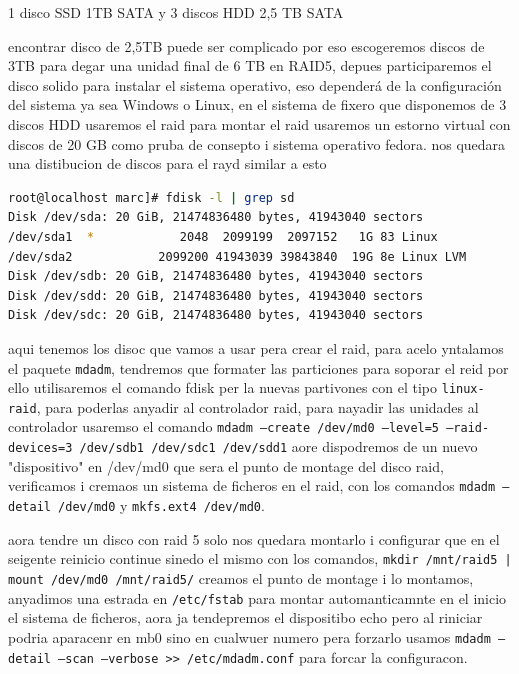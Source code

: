 \documentclass[preprint,11pt]{elsarticle}
\begin{document}
1 disco SSD 1TB SATA  y 3 discos  HDD 2,5 TB SATA\smallskip

encontrar disco de 2,5TB puede ser complicado por eso escogeremos discos de 3TB para degar una unidad final de 6 TB en RAID5, depues participaremos el disco solido para instalar el sistema operativo, eso dependerá de la configuración del sistema ya sea Windows o Linux, en el sistema de fixero que disponemos de 3 discos HDD usaremos el raid para montar el raid usaremos un estorno virtual con discos de 20 GB como pruba de consepto i sistema operativo fedora. nos quedara una distibucion de discos para el rayd similar a esto 

\begin{lstlisting}[basicstyle=\tiny, language=bash]
root@localhost marc]# fdisk -l | grep sd
Disk /dev/sda: 20 GiB, 21474836480 bytes, 41943040 sectors
/dev/sda1  *            2048  2099199  2097152   1G 83 Linux
/dev/sda2            2099200 41943039 39843840  19G 8e Linux LVM
Disk /dev/sdb: 20 GiB, 21474836480 bytes, 41943040 sectors
Disk /dev/sdd: 20 GiB, 21474836480 bytes, 41943040 sectors
Disk /dev/sdc: 20 GiB, 21474836480 bytes, 41943040 sectors

\end{lstlisting}

aqui tenemos los disoc que vamos a usar pera crear el raid, para acelo yntalamos el paquete \texttt{mdadm}, tendremos que formater las particiones para soporar el reid por ello utilisaremos el comando fdisk per la nuevas partivones con el tipo \texttt{linux-raid}, para poderlas anyadir al controlador raid, para nayadir las unidades al controlador usaremso el comando \texttt{mdadm --create /dev/md0 --level=5 --raid-devices=3 /dev/sdb1 /dev/sdc1 /dev/sdd1}  aore dispodremos de un nuevo "dispositivo" en /dev/md0 que sera el punto de montage del disco raid, verificamos i  cremaos un sistema de ficheros en el raid, con los comandos \texttt{mdadm --detail /dev/md0} y \texttt{mkfs.ext4 /dev/md0}.\smallskip

aora tendre un disco con raid 5 solo nos quedara montarlo i configurar que en el seigente reinicio continue sinedo el mismo con los comandos, \texttt{mkdir /mnt/raid5 | mount /dev/md0 /mnt/raid5/} creamos el punto de montage i lo montamos,  anyadimos una estrada en \texttt{/etc/fstab} para montar automanticamnte en el inicio el sistema de ficheros, aora ja tendepremos el dispositibo echo pero al riniciar podria aparacenr en mb0 sino en cualwuer numero pera forzarlo usamos \texttt{mdadm --detail --scan --verbose >> /etc/mdadm.conf} para forcar la configuracon.\smallskip
\end{document}

